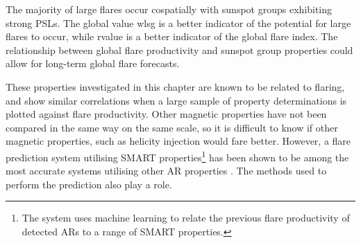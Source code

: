 The majority of large flares occur cospatially with sunspot groups exhibiting strong \glspl{PSL}. The global value \gls{wlsg} is a better indicator of the potential for large flares to occur, while \gls{rvalue} is a better indicator of the global flare index. The relationship between global flare productivity and sunspot group properties could allow for long-term global flare forecasts. %

These properties investigated in this chapter are known to be related to flaring, and show similar correlations when a large sample of property determinations is plotted against flare productivity. Other magnetic properties have not been compared in the same way on the same scale, so it is difficult to know if other magnetic properties, such as helicity injection would fare better. However, a flare prediction system utilising SMART properties\footnote{The system uses machine learning to relate the previous flare productivity of detected ARs to a range of SMART properties.} has been shown to be among the most accurate systems utilising other AR properties \citep{Ahmed:2011,Bloomfield:2012a}. The methods used to perform the prediction also play a role.


